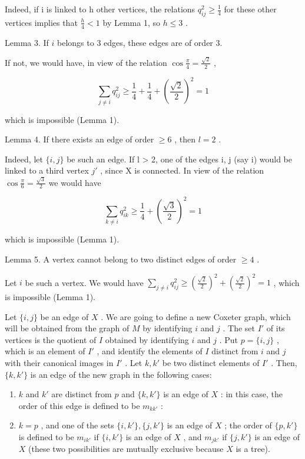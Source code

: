 Indeed, if i is linked to h other vertices, the relations \(q_{ij}^{2} \geqslant \frac{1}{4}\) for these other vertices implies that \(\frac{h}{4} < 1\) by Lemma 1, so \(h \leqslant 3\) .

Lemma 3. If \(i\) belongs to 3 edges, these edges are of order 3.

If not, we would have, in view of the relation \(\cos \frac{\pi}{4} = \frac{\sqrt{2}}{2}\) ,

\[
\sum_ {j \neq i} q _ {i j} ^ {2} \geqslant \frac {1}{4} + \frac {1}{4} + (\frac {\sqrt {2}}{2}) ^ {2} = 1
\]

which is impossible (Lemma 1).

Lemma 4. If there exists an edge of order \(\geqslant 6\) , then \(l = 2\) .

Indeed, let \(\{i,j\}\) be such an edge. If l \textgreater{} 2, one of the edges i, j (say i) would be linked to a third vertex \(j'\) , since X is connected. In view of the relation \(\cos \frac{\pi}{6} = \frac{\sqrt{3}}{2}\) we would have

\[
\sum_ {k \neq i} q _ {i k} ^ {2} \geqslant \frac {1}{4} + (\frac {\sqrt {3}}{2}) ^ {2} = 1
\]

which is impossible (Lemma 1).

Lemma 5. A vertex cannot belong to two distinct edges of order \(\geqslant 4\) .

Let \(i\) be such a vertex. We would have \(\sum_{j\neq i}q_{ij}^{2}\geqslant (\frac{\sqrt{2}}{2})^{2} + (\frac{\sqrt{2}}{2})^{2} = 1\) , which is impossible (Lemma 1).

Let \(\{i, j\}\) be an edge of \(X\) . We are going to define a new Coxeter graph, which will be obtained from the graph of \(M\) by identifying \(i\) and \(j\) . The set \(I'\) of its vertices is the quotient of \(I\) obtained by identifying \(i\) and \(j\) . Put \(p = \{i, j\}\) , which is an element of \(I'\) , and identify the elements of \(I\) distinct from \(i\) and \(j\) with their canonical images in \(I'\) . Let \(k, k'\) be two distinct elements of \(I'\) . Then, \(\{k, k'\}\) is an edge of the new graph in the following cases:

\begin{enumerate}
\def\labelenumi{\arabic{enumi})}
\item
  \(k\) and \(k'\) are distinct from \(p\) and \(\{k, k'\}\) is an edge of \(X\) : in this case, the order of this edge is defined to be \(m_{kk'}\) :
\item
  \(k = p\) , and one of the sets \(\{i, k'\}, \{j, k'\}\) is an edge of \(X\) ; the order of \(\{p, k'\}\) is defined to be \(m_{ik'}\) if \(\{i, k'\}\) is an edge of \(X\) , and \(m_{jk'}\) if \(\{j, k'\}\) is an edge of \(X\) (these two possibilities are mutually exclusive because \(X\) is a tree).
\end{enumerate}

